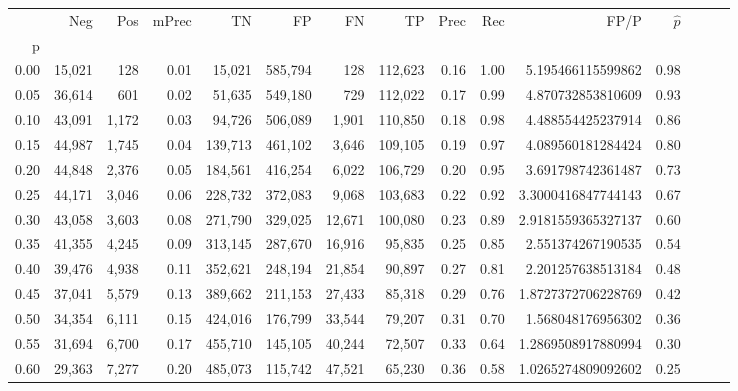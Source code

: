 \begin{tabular}{rrrrrrrrrrrrrrr}
\toprule
{} &     Neg &    Pos & mPrec &       TN &       FP &       FN &       TP &  Prec &   Rec &                 FP/P & $\hat{p}$ \\
p    &         &        &       &          &          &          &          &       &       &                      &           \\
\midrule
0.00 &  15,021 &    128 &  0.01 &   15,021 &  585,794 &      128 &  112,623 &  0.16 &  1.00 &    5.195466115599862 &      0.98 \\
0.05 &  36,614 &    601 &  0.02 &   51,635 &  549,180 &      729 &  112,022 &  0.17 &  0.99 &    4.870732853810609 &      0.93 \\
0.10 &  43,091 &  1,172 &  0.03 &   94,726 &  506,089 &    1,901 &  110,850 &  0.18 &  0.98 &    4.488554425237914 &      0.86 \\
0.15 &  44,987 &  1,745 &  0.04 &  139,713 &  461,102 &    3,646 &  109,105 &  0.19 &  0.97 &    4.089560181284424 &      0.80 \\
0.20 &  44,848 &  2,376 &  0.05 &  184,561 &  416,254 &    6,022 &  106,729 &  0.20 &  0.95 &    3.691798742361487 &      0.73 \\
0.25 &  44,171 &  3,046 &  0.06 &  228,732 &  372,083 &    9,068 &  103,683 &  0.22 &  0.92 &   3.3000416847744143 &      0.67 \\
0.30 &  43,058 &  3,603 &  0.08 &  271,790 &  329,025 &   12,671 &  100,080 &  0.23 &  0.89 &   2.9181559365327137 &      0.60 \\
0.35 &  41,355 &  4,245 &  0.09 &  313,145 &  287,670 &   16,916 &   95,835 &  0.25 &  0.85 &    2.551374267190535 &      0.54 \\
0.40 &  39,476 &  4,938 &  0.11 &  352,621 &  248,194 &   21,854 &   90,897 &  0.27 &  0.81 &    2.201257638513184 &      0.48 \\
0.45 &  37,041 &  5,579 &  0.13 &  389,662 &  211,153 &   27,433 &   85,318 &  0.29 &  0.76 &   1.8727372706228769 &      0.42 \\
0.50 &  34,354 &  6,111 &  0.15 &  424,016 &  176,799 &   33,544 &   79,207 &  0.31 &  0.70 &    1.568048176956302 &      0.36 \\
0.55 &  31,694 &  6,700 &  0.17 &  455,710 &  145,105 &   40,244 &   72,507 &  0.33 &  0.64 &   1.2869508917880994 &      0.30 \\
0.60 &  29,363 &  7,277 &  0.20 &  485,073 &  115,742 &   47,521 &   65,230 &  0.36 &  0.58 &   1.0265274809092602 &      0.25 \\

\end{tabular}
